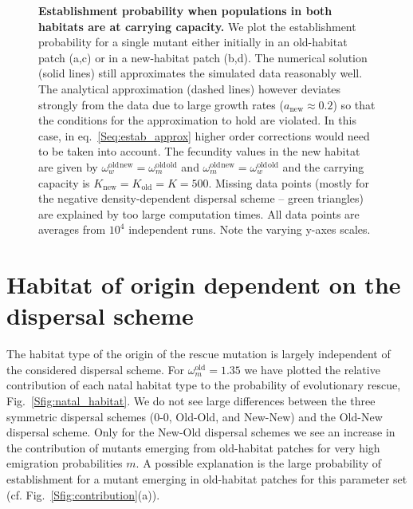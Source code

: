 \documentclass[a4paper,11pt]{scrartcl}
\newcommand{\chg}[1]{\textcolor{change}{#1}}
\begin{document}
\begin{figure}[h!]
  	\caption{\textbf{Establishment probability when populations in both habitats are at carrying capacity.} We plot the establishment probability for a single mutant either initially in an old-habitat patch (a,c) or in a new-habitat patch (b,d). The numerical solution (solid lines) still approximates the simulated data reasonably well. The analytical approximation (dashed lines) however deviates strongly from the data due to large growth rates ($a_{\text{new}}\approx 0.2$) so that the conditions for the approximation to hold are violated. In this case, in eq.~\eqref{Seq:estab_approx} higher order corrections would need to be taken into account. \chg{The fecundity values in the new habitat are given by $\omega^\text{old}_w^{\text{new}} = \omega^\text{old}_m^{\text{old}}$ and $\omega^\text{old}_m^{\text{new}} = \omega^\text{old}_w^{\text{old}}$ and the carrying capacity is $K_{\text{new}}=K_{\text{old}}=K=500$.} Missing data points (mostly for the negative density-dependent dispersal scheme -- green triangles) are explained by too large computation times. All data points are averages from $10^4$ independent runs. Note the varying y-axes scales.}
	\label{Sfig:pop_gen}
\end{figure}


\newpage
\section{Habitat of origin dependent on the dispersal scheme}
The habitat type of the origin of the rescue mutation is largely independent of the considered dispersal scheme. For $\omega^\text{old}_m=1.35$ we have plotted the relative contribution of each natal habitat type to the probability of evolutionary rescue, Fig.~\ref{Sfig:natal_habitat}. We do not see large differences between the three symmetric dispersal schemes (0-0, Old-Old, and New-New) and the Old-New dispersal scheme. \chg{Only for the New-Old dispersal schemes we see an increase in the contribution of mutants emerging from old-habitat patches for very high emigration probabilities $m$. A possible explanation is the large probability of establishment for a mutant emerging in old-habitat patches for this parameter set (cf. Fig.~\ref{Sfig:contribution}(a)).}
\end{document}
